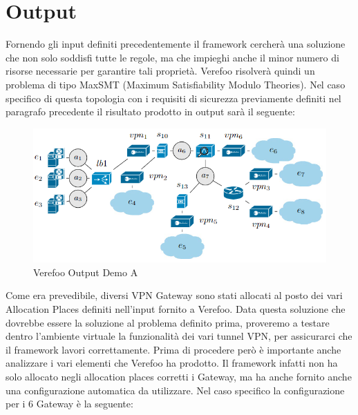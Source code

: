 \section{Output}
Fornendo gli input definiti precedentemente il framework cercherà una soluzione che non solo soddisfi tutte le regole, ma che impieghi anche il minor numero di risorse necessarie per garantire tali proprietà. Verefoo risolverà quindi un problema di tipo MaxSMT (Maximum Satisfiability Modulo Theories). 
Nel caso specifico di questa topologia con i requisiti di sicurezza previamente definiti nel paragrafo precedente il risultato prodotto in output sarà il seguente:
\begin{figure}[h]  %
    \centering
    \includegraphics[width=1\textwidth]{VPN_deploy.PNG} 
    \caption{Verefoo Output Demo A}
    \label{fig:VPNDeployA}
\end{figure}

Come era prevedibile, diversi VPN Gateway sono stati allocati al posto dei vari Allocation Places definiti nell'input fornito a Verefoo. Data questa soluzione che dovrebbe essere la soluzione al problema definito prima, proveremo a testare dentro l'ambiente virtuale la funzionalità dei vari tunnel VPN, per assicurarci che il framework lavori correttamente.
Prima di procedere però è importante anche analizzare i vari elementi che Verefoo ha prodotto. Il framework infatti non ha solo allocato negli allocation places corretti i Gateway, ma ha anche fornito anche una configurazione automatica da utilizzare. Nel caso specifico la configurazione per i 6 Gateway è la seguente:\\

